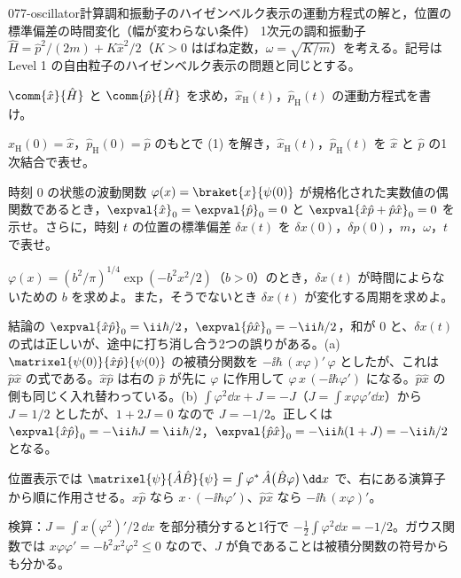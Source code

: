 \documentclass[uplatex,dvipdfmx,a4paper,11pt]{jsarticle}
\begin{document}
\begin{mondai}{077-oscillator}{計算}{調和振動子のハイゼンベルク表示の運動方程式の解と，位置の標準偏差の時間変化（幅が変わらない条件）}
1次元の調和振動子 $\hat{H}=\hat{p}^{2}/(2m)+K\hat{x}^{2}/2$（$K>0$ はばね定数，$\omega=\sqrt{K/m}$）を考える。記号は Level 1 の自由粒子のハイゼンベルク表示の問題と同じとする。
  \begin{shoumon}
    \item $\comm{\hat{x}}{\hat{H}}$ と $\comm{\hat{p}}{\hat{H}}$ を求め，$\hat{x}_{\mathrm{H}}(t)$，$\hat{p}_{\mathrm{H}}(t)$ の運動方程式を書け。
    \item $\hat{x}_{\mathrm{H}}(0)=\hat{x}$，$\hat{p}_{\mathrm{H}}(0)=\hat{p}$ のもとで (1) を解き，$\hat{x}_{\mathrm{H}}(t)$，$\hat{p}_{\mathrm{H}}(t)$ を $\hat{x}$ と $\hat{p}$ の1次結合で表せ。
    \item 時刻 $0$ の状態の波動関数 $\varphi(x)=\braket{x}{\psi(0)}$ が規格化された実数値の偶関数であるとき，$\expval{\hat{x}}_{0}=\expval{\hat{p}}_{0}=0$ と $\expval{\hat{x}\hat{p}+\hat{p}\hat{x}}_{0}=0$ を示せ。さらに，時刻 $t$ の位置の標準偏差 $\delta x(t)$ を $\delta x(0)$，$\delta p(0)$，$m$，$\omega$，$t$ で表せ。
    \item $\varphi(x)=(b^{2}/\pi)^{1/4}\exp(-b^{2}x^{2}/2)$（$b>0$）のとき，$\delta x(t)$ が時間によらないための $b$ を求めよ。また，そうでないとき $\delta x(t)$ が変化する周期を求めよ。
  \end{shoumon}

\begin{kotaeran}
   結論の $\expval{\hat{x}\hat{p}}_{0}=\ii\hbar/2$，$\expval{\hat{p}\hat{x}}_{0}=-\ii\hbar/2$，和が $0$ と、$\delta x(t)$ の式は正しいが、途中に打ち消し合う2つの誤りがある。(a) $\matrixel{\psi(0)}{\hat{x}\hat{p}}{\psi(0)}$ の被積分関数を $-\ii\hbar\,(x\varphi)'\,\varphi$ としたが、これは $\hat{p}\hat{x}$ の式である。$\hat{x}\hat{p}$ は右の $\hat{p}$ が先に $\varphi$ に作用して $\varphi\,x\,(-\ii\hbar\varphi')$ になる。$\hat{p}\hat{x}$ の側も同じく入れ替わっている。(b) $\int\varphi^{2}\dd x+J=-J$（$J=\int x\varphi\varphi'\dd x$）から $J=1/2$ としたが、$1+2J=0$ なので $J=-1/2$。正しくは $\expval{\hat{x}\hat{p}}_{0}=-\ii\hbar J=\ii\hbar/2$，$\expval{\hat{p}\hat{x}}_{0}=-\ii\hbar(1+J)=-\ii\hbar/2$ となる。
\end{kotaeran}
\begin{rikai}
  \item 位置表示では $\matrixel{\psi}{\hat{A}\hat{B}}{\psi}=\int\varphi^{*}\,\hat{A}\bigl(\hat{B}\varphi\bigr)\,\dd x$ で、右にある演算子から順に作用させる。$\hat{x}\hat{p}$ なら $x\cdot(-\ii\hbar\varphi')$、$\hat{p}\hat{x}$ なら $-\ii\hbar\,(x\varphi)'$。
  \item 検算：$J=\int x(\varphi^{2})'/2\,\dd x$ を部分積分すると1行で $-\frac{1}{2}\int\varphi^{2}\dd x=-1/2$。ガウス関数では $x\varphi\varphi'=-b^{2}x^{2}\varphi^{2}\le0$ なので、$J$ が負であることは被積分関数の符号からも分かる。
\end{rikai}
\end{mondai}
\end{document}
